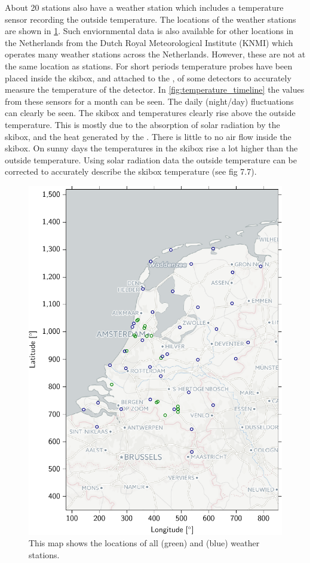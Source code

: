 About 20 \hisparc stations also have a weather station which includes a temperature sensor recording the outside temperature. The locations of the weather stations are shown in \cref{fig:weather-map}. Such enviornmental data is also available for other locations in the Netherlands from the Dutch Royal Meteorological Institute (KNMI) which operates many weather stations across the Netherlands. However, these are not at the same location as \hisparc stations. For short periods temperature probes have been placed inside the skibox, and attached to the \pmt, of some detectors to accurately measure the temperature of the detector. In \cref{fig:temperature_timeline} the values from these sensors for a month can be seen. The daily (night/day) fluctuations can clearly be seen. The skibox and \pmt temperatures clearly rise above the outside temperature. This is mostly due to the absorption of solar radiation by the skibox, and the heat generated by the \pmt. There is little to no air flow inside the skibox. On sunny days the temperatures in the skibox rise a lot higher than the outside temperature. Using solar radiation data the outside temperature can be corrected to accurately describe the skibox temperature (see \cite{devries2012weather} fig 7.7).

\begin{figure}
    \centering
    \includegraphics[width=.6\linewidth]{plots/station/weather-map}
    \caption{This map shows the locations of all \hisparc (green) and \knmi (blue) weather stations.}
    \label{fig:weather-map}
\end{figure}

